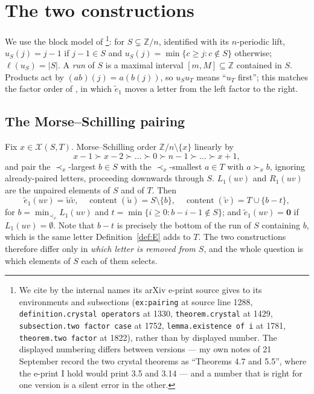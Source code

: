 \documentclass[11pt]{article}
\theoremstyle{definition}
\newcommand{\Z}{\mathbb{Z}}
\newcommand{\cont}{\operatorname{content}}
\newcommand{\et}{\tilde e_1}
\newcommand{\XX}{\mathcal{X}}
\begin{document}
\section{The two constructions}\label{sec:setup}

We use the block model of \cite[\S2]{Clio2}\footnote{We cite \cite{MS} by the internal names its arXiv e-print source gives to
its environments and subsections (\texttt{ex:pairing} at source line 1288,
\texttt{definition.crystal operators} at 1330, \texttt{theorem.crystal} at 1429,
\texttt{subsection.two factor case} at 1752, \texttt{lemma.existence of i} at 1781,
\texttt{theorem.two factor} at 1822), rather than by displayed number. The displayed numbering
differs between versions --- my own notes of 21 September record the two crystal theorems as
``Theorems 4.7 and 5.5'', where the e-print I hold would print 3.5 and 3.14 --- and a number
that is right for one version is a silent error in the other.}: for $S\subsetneq\Z/n$, identified with its
$n$-periodic lift, $u_S(j)=j-1$ if $j-1\in S$ and $u_S(j)=\min\{c\ge j:c\notin S\}$ otherwise;
$\ell(u_S)=|S|$. A \emph{run} of $S$ is a maximal interval $[m,M]\subseteq\Z$ contained in $S$.
Products act by $(ab)(j)=a(b(j))$, so $u_Su_T$ means ``$u_T$ first''; this matches the factor
order of \cite{MS}, in which $\et$ moves a letter from the left factor to the right.

\subsection{The Morse--Schilling pairing}

Fix $x\in\XX(S,T)$. Morse--Schilling order $\Z/n\setminus\{x\}$ linearly by
\begin{equation}\label{eq:order}
  x-1\succ x-2\succ\dots\succ0\succ n-1\succ\dots\succ x+1 ,
\end{equation}
and pair the $\prec_x$-largest $b\in S$ with the $\prec_x$-smallest $a\in T$ with $a\succ_x b$,
ignoring already-paired letters, proceeding downwards through $S$. $L_1(uv)$ and $R_1(uv)$ are
the unpaired elements of $S$ and of $T$. Then \cite[Def.~\texttt{crystal operators}(i)]{MS}
\[
  \et(uv)=\tilde u\tilde v,\quad
  \cont(\tilde u)=S\setminus\{b\},\quad \cont(\tilde v)=T\cup\{b-t\},
\]
for $b=\min_{\prec_x}L_1(uv)$ and $t=\min\{i\ge0: b-i-1\notin S\}$; and $\et(uv)=\mathbf 0$ if
$L_1(uv)=\emptyset$. Note that $b-t$ is precisely the bottom of the run of $S$ containing $b$,
which is the same letter Definition~\ref{def:E} adds to $T$. The two constructions therefore
differ only in \emph{which letter is removed from $S$}, and the whole question is which
elements of $S$ each of them selects.
\end{document}
